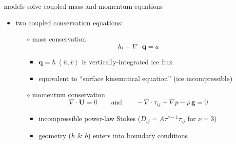 \documentclass[xcolor={dvipsnames}]{beamer}
\newcommand\bq{\mathbf{q}}
\newcommand\bU{\mathbf{U}}
\newcommand\Div{\nabla\cdot}
\newcommand{\ip}[2]{\ensuremath{\left<#1,#2\right>}}
\begin{document}
\begin{frame}{models solve coupled mass and momentum equations}

\begin{itemize}
\item two coupled conservation equations:
  \begin{itemize}
  \item[$\circ$]  \alert{mass conservation}
\begin{equation*}
h_t + \Div\bq = a
\end{equation*}
    \begin{itemize}
    \vspace{-5mm}
    \item $\bq = h\, \ip{\bar u}{\bar v}$ is vertically-integrated ice flux
    \item equivalent to ``surface kinematical equation'' (ice incompressible)
    \end{itemize}
  \item[$\circ$]  \alert{momentum conservation}
\begin{equation*}
  \nabla \cdot \bU = 0 \qquad \text{and} \qquad - \nabla \cdot \tau_{ij} + \nabla p - \rho\, \mathbf{g} = 0
\end{equation*}
    \begin{itemize}
    \vspace{-5mm}
    \item incompressible power-law Stokes ($D_{ij} = A \tau^{\nu-1} \tau_{ij}$ for $\nu=3$)
    \item geometry ($h$ \& $b$) enters into boundary conditions
    \end{itemize}
  \end{itemize}
\end{itemize}
\end{frame}
\end{document}

